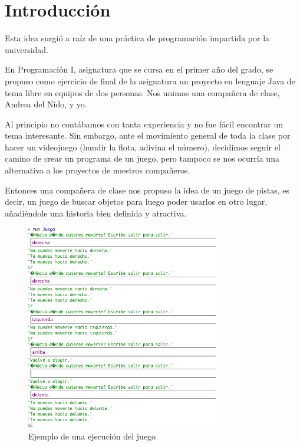 \chapter{Introducción}

Esta idea surgió a raíz de una práctica de programación impartida por la universidad.

En Programación I, asignatura que se cursa en el primer año del grado, se propuso como ejercicio de final de la asignatura un proyecto en lenguaje Java de tema libre en equipos de dos personas. Nos unimos una compañera de clase, Andrea del Nido, y yo. 

Al principio no contábamos con tanta experiencia y no fue fácil encontrar un tema interesante. Sin embargo, ante el movimiento general de toda la clase por hacer un videojuego (hundir la flota, adivina el número), decidimos seguir el camino de crear un programa de un juego, pero tampoco se nos ocurría una alternativa a los proyectos de nuestros compañeros.

Entonces una compañera de clase nos propuso la idea de un juego de pistas, es decir, un juego de buscar objetos para luego poder usarlos en otro lugar, añadiéndole una historia bien definida y atractiva.

\begin{figure}[h]
	\caption{Ejemplo de una ejecución del juego}
	\centering
	\includegraphics[width=0.75\textwidth]{include/primerJuegoCaptura.png}
\end{figure}

